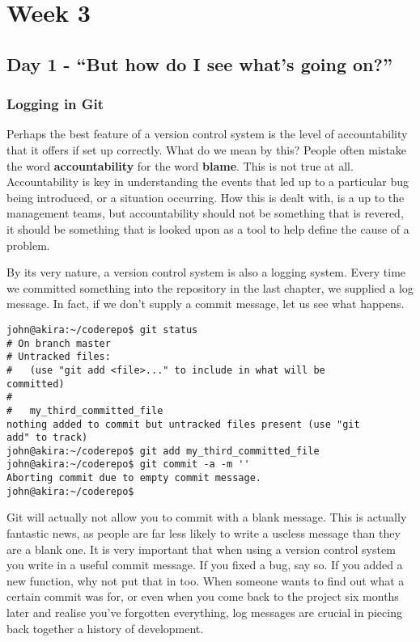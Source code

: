\cleardoublepage
\chapter{Week 3}
\section{Day 1 - ``But how do I see what's going on?''}
\subsection{Logging in Git}

Perhaps the best feature of a version control system is the level of accountability that it offers if set up correctly.  What do we mean by this?  People often mistake the word \textbf{accountability} for the word \textbf{blame}.  This is not true at all.  Accountability is key in understanding the events that led up to a particular bug being introduced, or a situation occurring.  How this is dealt with, is a up to the management teams, but accountability should not be something that is revered, it should be something that is looked upon as a tool to help define the cause of a problem.

By its very nature, a version control system is also a logging system.  Every time we committed something into the repository in the last chapter, we supplied a log message.  In fact, if we don't supply a commit message, let us see what happens.

\begin{Verbatim}[frame=leftline,framerule=1mm,fontsize=\relsize{-3}] 
john@akira:~/coderepo$ git status
# On branch master
# Untracked files:
#   (use "git add <file>..." to include in what will be 
committed)
#
#	my_third_committed_file
nothing added to commit but untracked files present (use "git 
add" to track)
john@akira:~/coderepo$ git add my_third_committed_file
john@akira:~/coderepo$ git commit -a -m ''
Aborting commit due to empty commit message.
john@akira:~/coderepo$ 
\end{Verbatim}

Git will actually not allow you to commit with a blank message.  This is actually fantastic news, as people are far less likely to write a useless message than they are a blank one.  It is very important that when using a version control system you write in a useful commit message.  If you fixed a bug, say so.  If you added a new function, why not put that in too.  When someone wants to find out what a certain commit was for, or even when you come back to the project six months later and realise you've forgotten everything, log messages are crucial in piecing back together a history of development.

